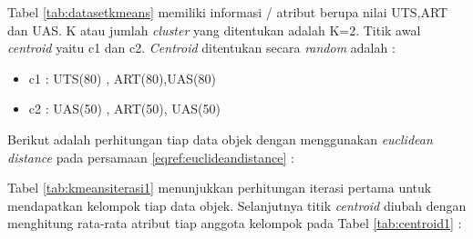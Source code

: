 Tabel \ref{tab:datasetkmeans} memiliki informasi  / atribut berupa nilai UTS,ART dan UAS. K atau jumlah \textit{cluster} yang ditentukan adalah K=2. Titik awal \textit{centroid} yaitu c1 dan c2. \textit{Centroid}  ditentukan secara \textit{random} adalah :

\begin{itemize}
\item c1 : UTS(80) , ART(80),UAS(80)
\item c2 : UAS(50) , ART(50), UAS(50)
\end{itemize}
\pagebreak
Berikut adalah perhitungan tiap data objek dengan menggunakan \textit{euclidean distance} pada persamaan \eqref{eqref:euclideandistance} : 

\begin{table}[ht]
\centering
{}
\caption{perhitungan k-Means iterasi ke-1}
\label{tab:kmeansiterasi1}
\end{table} 

Tabel \ref{tab:kmeansiterasi1} menunjukkan perhitungan iterasi pertama untuk mendapatkan kelompok tiap data objek. Selanjutnya titik \textit{centroid} diubah dengan menghitung rata-rata atribut tiap anggota kelompok
pada Tabel \ref{tab:centroid1} :

